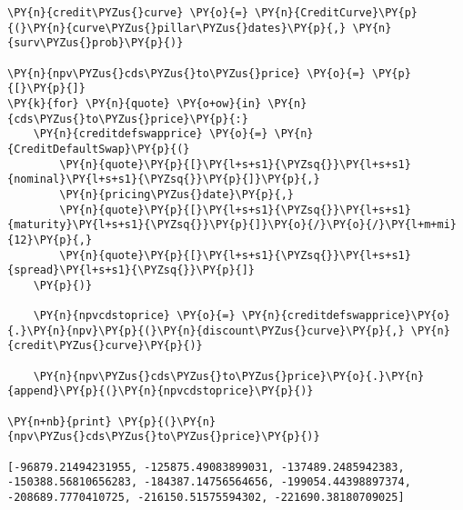 \begin{Answer}
\begin{tcolorbox}[breakable, size=fbox, boxrule=1pt, pad at break*=1mm,colback=cellbackground, colframe=cellborder]
\begin{Verbatim}[commandchars=\\\{\}]
\PY{n}{credit\PYZus{}curve} \PY{o}{=} \PY{n}{CreditCurve}\PY{p}{(}\PY{n}{curve\PYZus{}pillar\PYZus{}dates}\PY{p}{,} \PY{n}{surv\PYZus{}prob}\PY{p}{)}

\PY{n}{npv\PYZus{}cds\PYZus{}to\PYZus{}price} \PY{o}{=} \PY{p}{[}\PY{p}{]}
\PY{k}{for} \PY{n}{quote} \PY{o+ow}{in} \PY{n}{cds\PYZus{}to\PYZus{}price}\PY{p}{:}
    \PY{n}{creditdefswapprice} \PY{o}{=} \PY{n}{CreditDefaultSwap}\PY{p}{(}
        \PY{n}{quote}\PY{p}{[}\PY{l+s+s1}{\PYZsq{}}\PY{l+s+s1}{nominal}\PY{l+s+s1}{\PYZsq{}}\PY{p}{]}\PY{p}{,}              
        \PY{n}{pricing\PYZus{}date}\PY{p}{,}
        \PY{n}{quote}\PY{p}{[}\PY{l+s+s1}{\PYZsq{}}\PY{l+s+s1}{maturity}\PY{l+s+s1}{\PYZsq{}}\PY{p}{]}\PY{o}{/}\PY{o}{/}\PY{l+m+mi}{12}\PY{p}{,}
        \PY{n}{quote}\PY{p}{[}\PY{l+s+s1}{\PYZsq{}}\PY{l+s+s1}{spread}\PY{l+s+s1}{\PYZsq{}}\PY{p}{]}   
    \PY{p}{)}

    \PY{n}{npvcdstoprice} \PY{o}{=} \PY{n}{creditdefswapprice}\PY{o}{.}\PY{n}{npv}\PY{p}{(}\PY{n}{discount\PYZus{}curve}\PY{p}{,} \PY{n}{credit\PYZus{}curve}\PY{p}{)}
    
    \PY{n}{npv\PYZus{}cds\PYZus{}to\PYZus{}price}\PY{o}{.}\PY{n}{append}\PY{p}{(}\PY{n}{npvcdstoprice}\PY{p}{)}

\PY{n+nb}{print} \PY{p}{(}\PY{n}{npv\PYZus{}cds\PYZus{}to\PYZus{}price}\PY{p}{)}

[-96879.21494231955, -125875.49083899031, -137489.2485942383,
-150388.56810656283, -184387.14756564656, -199054.44398897374,
-208689.7770410725, -216150.51575594302, -221690.38180709025]
    \end{Verbatim}
\end{tcolorbox}
\end{Answer}
